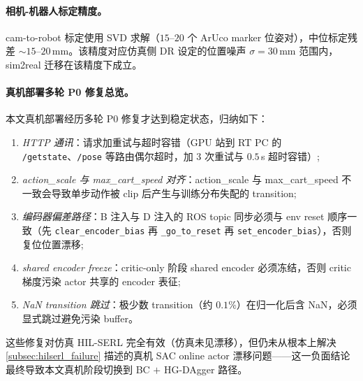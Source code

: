 \paragraph{相机-机器人标定精度。}cam-to-robot 标定使用 SVD 求解（$15$–$20$ 个 ArUco marker 位姿对），中位标定残差 $\sim 15$–$20$\,mm。该精度对应仿真侧 DR 设定的位置噪声 $\sigma = 30$\,mm 范围内，sim2real 迁移在该精度下成立。

\paragraph{真机部署多轮 P0 修复总览。}本文真机部署经历多轮 P0 修复才达到稳定状态，归纳如下：
\begin{enumerate}
  \item \emph{HTTP 通讯}：请求加重试与超时容错（GPU 站到 RT PC 的 \texttt{/getstate}、\texttt{/pose} 等路由偶尔超时，加 $3$ 次重试与 $0.5$\,s 超时容错）;
  \item \emph{action\_scale 与 max\_cart\_speed 对齐}：action\_scale 与 max\_cart\_speed 不一致会导致单步动作被 clip 后产生与训练分布失配的 transition;
  \item \emph{编码器偏差路径}：B 注入与 D 注入的 ROS topic 同步必须与 env reset 顺序一致（先 \texttt{clear\_encoder\_bias} 再 \texttt{\_go\_to\_reset} 再 \texttt{set\_encoder\_bias}），否则复位位置漂移;
  \item \emph{shared encoder freeze}：critic-only 阶段 shared encoder 必须冻结，否则 critic 梯度污染 actor 共享的 encoder 表征;
  \item \emph{NaN transition 跳过}：极少数 transition（约 $0.1\%$）在归一化后含 NaN，必须显式跳过避免污染 buffer。
\end{enumerate}

这些修复对仿真 HIL-SERL 完全有效（仿真未见漂移），但仍未从根本上解决\cref{subsec:hilserl_failure} 描述的真机 SAC online actor 漂移问题——这一负面结论最终导致本文真机阶段切换到 BC $+$ HG-DAgger 路径。
